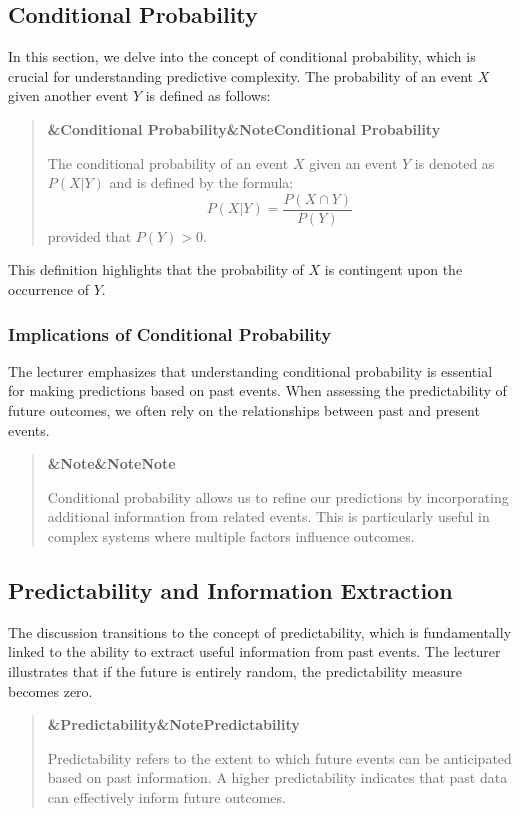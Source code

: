 \documentclass[a4paper]{article}
\newcommand{\boxheading}[1]{%
  \par\smallskip
  \noindent\textbf{\ifx&#1&Note\else#1\fi}\par
  \smallskip
}
\newenvironment{defbox}[1][]{%
  \begin{quote}\color{green!40!black}\boxheading{#1}\normalcolor
}{\end{quote}}
\newenvironment{rembox}[1][]{%
  \begin{quote}\color{black!70}\boxheading{#1}\normalcolor
}{\end{quote}}
\begin{document}
\subsection{Conditional Probability}
In this section, we delve into the concept of conditional probability, which is crucial for understanding predictive complexity. The probability of an event \( X \) given another event \( Y \) is defined as follows:

\begin{defbox}[Conditional Probability]
The conditional probability of an event \( X \) given an event \( Y \) is denoted as \( P(X|Y) \) and is defined by the formula:
\[
P(X|Y) = \frac{P(X \cap Y)}{P(Y)}
\]
provided that \( P(Y) > 0 \).
\end{defbox}

This definition highlights that the probability of \( X \) is contingent upon the occurrence of \( Y \). 

\subsubsection{Implications of Conditional Probability}
The lecturer emphasizes that understanding conditional probability is essential for making predictions based on past events. When assessing the predictability of future outcomes, we often rely on the relationships between past and present events.

\begin{rembox}[Note]
Conditional probability allows us to refine our predictions by incorporating additional information from related events. This is particularly useful in complex systems where multiple factors influence outcomes.
\end{rembox}

\subsection{Predictability and Information Extraction}
The discussion transitions to the concept of predictability, which is fundamentally linked to the ability to extract useful information from past events. The lecturer illustrates that if the future is entirely random, the predictability measure becomes zero.

\begin{defbox}[Predictability]
Predictability refers to the extent to which future events can be anticipated based on past information. A higher predictability indicates that past data can effectively inform future outcomes.
\end{defbox}
\end{document}
